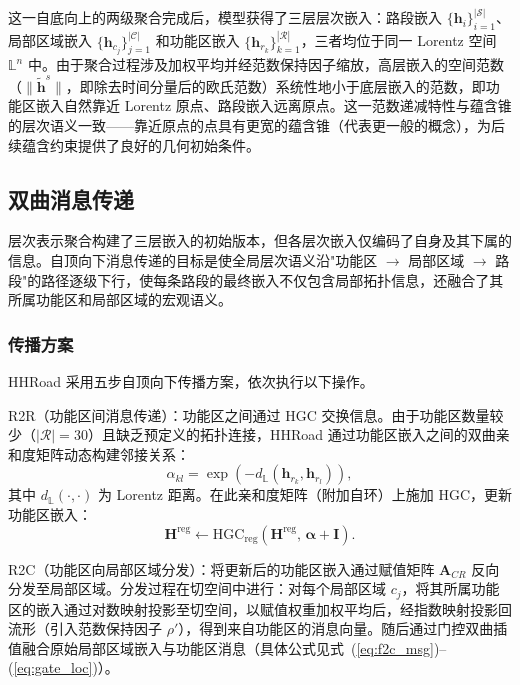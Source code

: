 这一自底向上的两级聚合完成后，模型获得了三层层次嵌入：路段嵌入 $\{\mathbf{h}_i\}_{i=1}^{|\mathcal{S}|}$、局部区域嵌入 $\{\mathbf{h}_{c_j}\}_{j=1}^{|\mathcal{C}|}$ 和功能区嵌入 $\{\mathbf{h}_{r_k}\}_{k=1}^{|\mathcal{R}|}$，三者均位于同一 Lorentz 空间 $\mathbb{L}^n$ 中。由于聚合过程涉及加权平均并经范数保持因子缩放，高层嵌入的空间范数（$\|\tilde{\mathbf{h}}^s\|$，即除去时间分量后的欧氏范数）系统性地小于底层嵌入的范数，即功能区嵌入自然靠近 Lorentz 原点、路段嵌入远离原点。这一范数递减特性与蕴含锥的层次语义一致——靠近原点的点具有更宽的蕴含锥（代表更一般的概念），为后续蕴含约束提供了良好的几何初始条件。

\subsection{双曲消息传递}
\label{sec:message_passing}

层次表示聚合构建了三层嵌入的初始版本，但各层次嵌入仅编码了自身及其下属的信息。自顶向下消息传递的目标是使全局层次语义沿"功能区 $\to$ 局部区域 $\to$ 路段"的路径逐级下行，使每条路段的最终嵌入不仅包含局部拓扑信息，还融合了其所属功能区和局部区域的宏观语义。

\subsubsection{传播方案}

HHRoad 采用五步自顶向下传播方案，依次执行以下操作。

R2R（功能区间消息传递）：功能区之间通过 HGC 交换信息。由于功能区数量较少（$|\mathcal{R}|=30$）且缺乏预定义的拓扑连接，HHRoad 通过功能区嵌入之间的双曲亲和度矩阵动态构建邻接关系：
\begin{equation}
    \alpha_{kl} = \exp\!\left(-d_{\mathbb{L}}(\mathbf{h}_{r_k}, \mathbf{h}_{r_l})\right),
    \label{eq:region_affinity}
\end{equation}
其中 $d_{\mathbb{L}}(\cdot, \cdot)$ 为 Lorentz 距离。在此亲和度矩阵（附加自环）上施加 HGC，更新功能区嵌入：
\begin{equation}
    \mathbf{H}^{\text{reg}} \leftarrow \text{HGC}_{\text{reg}}\!\left(\mathbf{H}^{\text{reg}},\, \boldsymbol{\alpha} + \mathbf{I}\right).
    \label{eq:r2r}
\end{equation}

R2C（功能区向局部区域分发）：将更新后的功能区嵌入通过赋值矩阵 $\mathbf{A}_{CR}$ 反向分发至局部区域。分发过程在切空间中进行：对每个局部区域 $c_j$，将其所属功能区的嵌入通过对数映射投影至切空间，以赋值权重加权平均后，经指数映射投影回流形（引入范数保持因子 $\rho'$），得到来自功能区的消息向量。随后通过门控双曲插值融合原始局部区域嵌入与功能区消息（具体公式见式~(\ref{eq:f2c_msg})--(\ref{eq:gate_loc})）。


